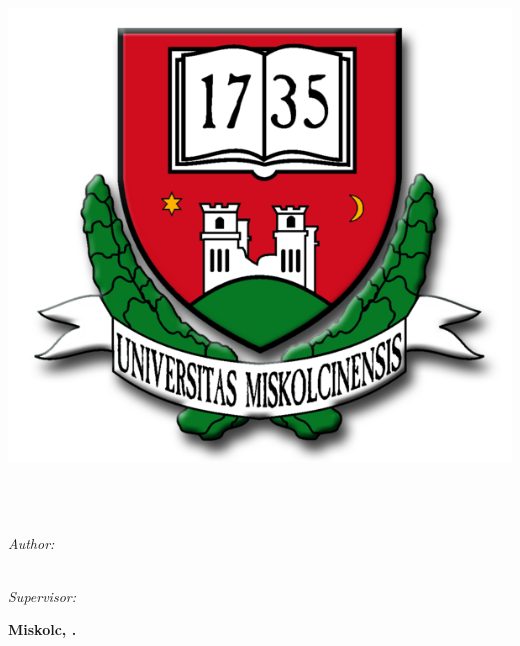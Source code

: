 \documentclass[12pt, a4paper, oneside]{Thesis} %
\begin{document}

\begin{titlepage}
\begin{flushleft}
\large{
\univname\\
\instname\\
\deptname
}
\end{flushleft}
\begin{center}


\vspace{1cm}

\includegraphics[width=0.4\linewidth]{./figures/miskolc_logo}

\vspace{1cm}

{\fontsize{20pt}{20pt}\selectfont \bfseries \ttitle}\\[0.4cm] %

\textsc{\large \degreename}\\[0.5cm] %
 
 \vspace{4.5cm}

\textit{Author:}\\
\authornames\\
\textsc{\authorId}
 
\vspace{2cm}

\textit{Supervisor:}\\
\supname

\vspace{2cm}

\textbf{Miskolc, \the\year.}
 
\vfill
\end{center}

\end{titlepage}





{\fontsize{12pt}{14pt}\selectfont \tableofcontents}










\newpage

\end{document}
